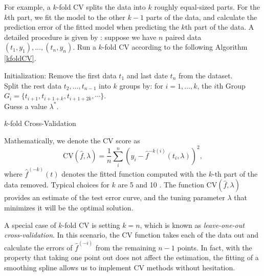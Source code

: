 For example, a $k$-fold CV splits the data into $k$ roughly equal-sized parts. For the $k$th part, we fit the model to the other $k-1$ parts of the data, and calculate the prediction error of the fitted model when predicting the $k$th part of the data. A detailed procedure is given by \cite{wahba1975completely}: suppose we have $n$ paired data $(t_1,y_1), \ldots, (t_n,y_n)$. Run a $k$-fold CV according to the following Algorithm \ref{kfoldCV}. 
\begin{algorithm}[h]
\SetAlgoLined 
Initialization: Remove the first data $t_1$ and last date $t_n$ from the dataset. \\
Split the rest data $t_2,\ldots,t_{n-1}$ into $k$ groups by: for $i=1,\ldots,k$, the $i$th Group $G_i=\{t_{i+1}, t_{i+1+k}, t_{i+1+2k}, \cdots\}$.\\
Guess a value $\lambda^*$. \\
\caption{$k$-fold Cross-Validation}\label{kfoldCV}
\end{algorithm}
Mathematically, we denote the CV score as 
\begin{equation}\label{chapOneCVform}
\mbox{CV}(\hat{f},\lambda) = \frac{1}{n}\sum_i^n \left( y_i -\hat{f}^{-k(i)}(t_i,\lambda) \right)^2,
\end{equation}
where $\hat{f}^{(-k)}(t)$ denotes the fitted function computed with the $k$-th part of the data removed. Typical choices for $k$ are 5 and 10 \citep{esl2009}.  The function $\mbox{CV}(\hat{f},\lambda)$ provides an estimate of the test error curve, and the tuning parameter $\lambda$ that minimizes it will be the optimal solution. 

A special case of $k$-fold CV is setting $k=n$, which is known as \textit{leave-one-out cross-validation}. In this scenario, the CV function takes each of the data out and calculate the errors of $\hat{f}^{(-i)}$ from the remaining $n-1$ points. In fact, with the property that taking one point out does not affect the estimation, the fitting of a smoothing spline allows us to implement CV methods without hesitation. 

